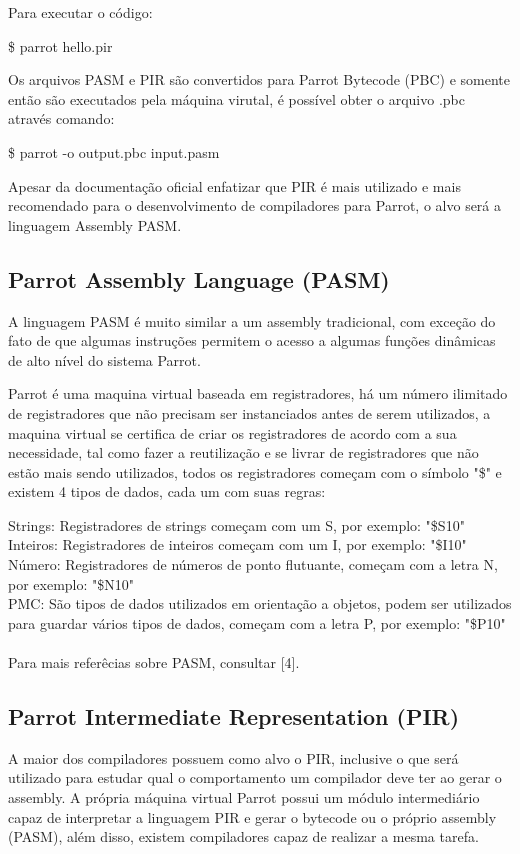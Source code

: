 \documentclass[12pt,a4paper,twoside]{report}
\begin{document}

Para executar o código:
\begin{terminal}
\$ parrot hello.pir
\end{terminal}

Os arquivos PASM e PIR são convertidos para Parrot Bytecode (PBC) e somente então são executados pela máquina virutal, é possível obter o arquivo .pbc através comando:
\begin{terminal}
\$ parrot -o output.pbc input.pasm
\end{terminal}

Apesar da documentação oficial enfatizar que PIR é mais utilizado e mais recomendado para o desenvolvimento de compiladores para Parrot, o alvo será a linguagem Assembly PASM.

\subsection{Parrot Assembly Language (PASM)}
A linguagem PASM é muito similar a um assembly tradicional, com exceção do fato de que algumas instruções permitem o acesso a algumas funções dinâmicas de alto nível do sistema Parrot.

Parrot é uma maquina virtual baseada em registradores, há um número ilimitado de registradores que não precisam ser instanciados antes de serem utilizados, a maquina virtual se certifica de criar os registradores de acordo com a sua necessidade,
tal como fazer a reutilização e se livrar de registradores que não estão mais sendo utilizados, todos os registradores começam com o símbolo "\$" e existem 4 tipos de dados, cada um com suas regras:


Strings: Registradores de strings começam com um S, por exemplo: "\$S10" \\
Inteiros: Registradores de inteiros começam com um I, por exemplo: "\$I10" \\
Número: Registradores de números de ponto flutuante, começam com a letra N, por exemplo: "\$N10" \\
PMC: São tipos de dados utilizados em orientação a objetos, podem ser utilizados para guardar vários tipos de dados, começam com a letra P, por exemplo: "\$P10" \\
\\
Para mais referêcias sobre PASM, consultar [4].

\subsection{Parrot Intermediate Representation (PIR)}
A maior dos compiladores possuem como alvo o PIR, inclusive o que será
utilizado para estudar qual o comportamento um compilador deve ter ao
gerar o assembly.
A própria máquina virtual Parrot possui um módulo intermediário capaz
de interpretar a linguagem PIR e gerar o bytecode ou o próprio
assembly (PASM), além disso, existem compiladores capaz de realizar a
mesma tarefa.
\end{document}
